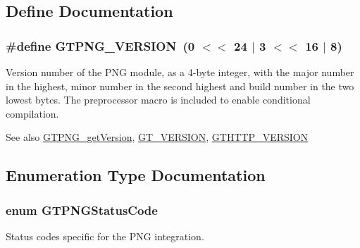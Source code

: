 \subsection{Define Documentation}
\hypertarget{group__png_ga85c3c057105e954a4504dbe98ba9a2ba}{
\subsubsection[{GTPNG\_\-VERSION}]{\setlength{\rightskip}{0pt plus 5cm}\#define GTPNG\_\-VERSION~(0 $<$$<$ 24 $|$ 3 $<$$<$ 16 $|$ 8)}}
\label{group__png_ga85c3c057105e954a4504dbe98ba9a2ba}
Version number of the PNG module, as a 4-\/byte integer, with the major number in the highest, minor number in the second highest and build number in the two lowest bytes. The preprocessor macro is included to enable conditional compilation.

\begin{DoxySeeAlso}{See also}
\hyperlink{group__png_ga912eedbe157a29e9b1b40d7438ccf7d4}{GTPNG\_\-getVersion}, \hyperlink{group__common_gafdac78985a08fc5052b1d1f2888a25c9}{GT\_\-VERSION}, \hyperlink{group__http_gacf85f4c0d316a03db66a8ef24ddf3411}{GTHTTP\_\-VERSION} 
\end{DoxySeeAlso}


\subsection{Enumeration Type Documentation}
\hypertarget{group__png_ga70021c722b39d6b5945e9dd65b5d3b77}{
\subsubsection[{GTPNGStatusCode}]{\setlength{\rightskip}{0pt plus 5cm}enum {\bf GTPNGStatusCode}}}
\label{group__png_ga70021c722b39d6b5945e9dd65b5d3b77}
Status codes specific for the PNG integration.

